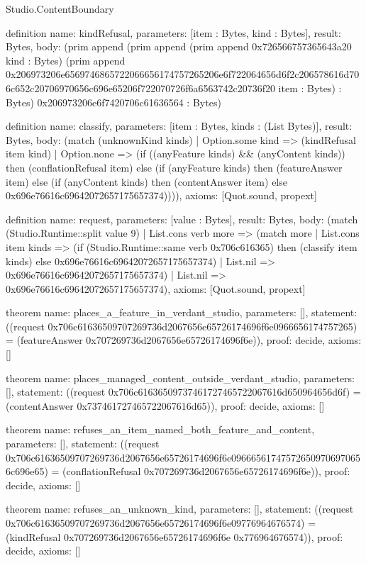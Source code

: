 \begin{lexlean}{Studio.ContentBoundary}
\begin{semanticmodule}
definition{
  name: kindRefusal,
  parameters: [item : Bytes, kind : Bytes],
  result: Bytes,
  body: (prim append (prim append (prim append 0x726566757365643a20 kind : Bytes) (prim append 0x206973206e6569746865722066656174757265206e6f722064656d6f2c206578616d706c652c20706970656c696e65206f722070726f6a6563742c20736f20 item : Bytes) : Bytes) 0x206973206e6f7420706c61636564 : Bytes)
}

definition{
  name: classify,
  parameters: [item : Bytes, kinds : (List Bytes)],
  result: Bytes,
  body: (match (unknownKind kinds)
    | Option.some kind => (kindRefusal item kind)
    | Option.none => (if ((anyFeature kinds) && (anyContent kinds)) then (conflationRefusal item) else (if (anyFeature kinds) then (featureAnswer item) else (if (anyContent kinds) then (contentAnswer item) else 0x696e76616c69642072657175657374)))),
  axioms: [Quot.sound, propext]
}

definition{
  name: request,
  parameters: [value : Bytes],
  result: Bytes,
  body: (match (Studio.Runtime::split value 9)
    | List.cons verb more => (match more
      | List.cons item kinds => (if (Studio.Runtime::same verb 0x706c616365) then (classify item kinds) else 0x696e76616c69642072657175657374)
      | List.nil => 0x696e76616c69642072657175657374)
    | List.nil => 0x696e76616c69642072657175657374),
  axioms: [Quot.sound, propext]
}

theorem{
  name: places_a_feature_in_verdant_studio,
  parameters: [],
  statement: ((request 0x706c61636509707269736d2067656e65726174696f6e0966656174757265) = (featureAnswer 0x707269736d2067656e65726174696f6e)),
  proof: decide{},
  axioms: []
}

theorem{
  name: places_managed_content_outside_verdant_studio,
  parameters: [],
  statement: ((request 0x706c61636509737461727465722067616d650964656d6f) = (contentAnswer 0x737461727465722067616d65)),
  proof: decide{},
  axioms: []
}

theorem{
  name: refuses_an_item_named_both_feature_and_content,
  parameters: [],
  statement: ((request 0x706c61636509707269736d2067656e65726174696f6e096665617475726509706970656c696e65) = (conflationRefusal 0x707269736d2067656e65726174696f6e)),
  proof: decide{},
  axioms: []
}

theorem{
  name: refuses_an_unknown_kind,
  parameters: [],
  statement: ((request 0x706c61636509707269736d2067656e65726174696f6e09776964676574) = (kindRefusal 0x707269736d2067656e65726174696f6e 0x776964676574)),
  proof: decide{},
  axioms: []
}
\end{semanticmodule}
\end{lexlean}
